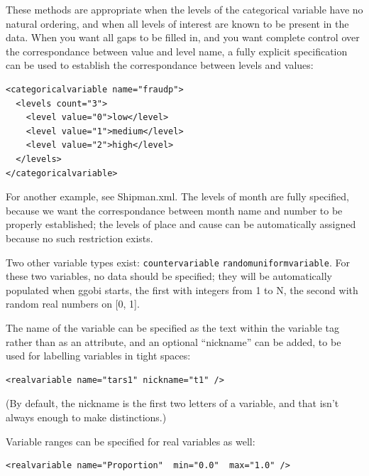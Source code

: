 \documentclass{article}
\begin{document}
These methods are appropriate when the levels of the categorical
variable have no natural ordering, and when all levels of interest are
known to be present in the data.  When you want all gaps to be filled
in, and you want complete control over the correspondance between
value and level name, a fully explicit specification can be used to
establish the correspondance between levels and values:
%
\begin{verbatim}
<categoricalvariable name="fraudp">
  <levels count="3">
    <level value="0">low</level>
    <level value="1">medium</level>
    <level value="2">high</level>
  </levels>
</categoricalvariable>
\end{verbatim}
%
For another example, see Shipman.xml.  The levels of month are
fully specified, because we want the correspondance between month
name and number to be properly established; the levels of place
and cause can be automatically assigned because no such restriction
exists.

Two other variable types exist: \texttt{countervariable}
\texttt{randomuniformvariable}.  For these two variables, no data
should be specified; they will be automatically populated when
ggobi starts, the first with integers from 1 to N, the second
with random real numbers on [0, 1].

The name of the variable can be specified as the text within the
variable tag rather than as an attribute, and an optional ``nickname''
can be added, to be used for labelling variables in tight spaces:
\begin{verbatim}
<realvariable name="tars1" nickname="t1" />
\end{verbatim}
%
(By default, the nickname is the first two letters of a variable,
and that isn't always enough to make distinctions.)

Variable ranges can be specified for real variables as well:

\begin{verbatim}
<realvariable name="Proportion"  min="0.0"  max="1.0" />
\end{verbatim}

\end{document}

